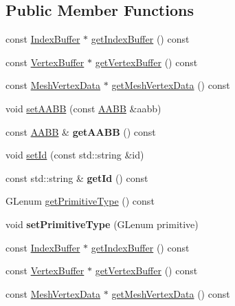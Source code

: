 \subsection*{Public Member Functions}
\begin{DoxyCompactItemize}
\item 
const \hyperlink{classIndexBuffer}{Index\+Buffer} $\ast$ \hyperlink{classMeshIndexData_af62aa3dff45b86690cd6d8eb412843b3}{get\+Index\+Buffer} () const
\item 
const \hyperlink{classVertexBuffer}{Vertex\+Buffer} $\ast$ \hyperlink{classMeshIndexData_abc2bce53ba2a672d1b5919a144e13c71}{get\+Vertex\+Buffer} () const
\item 
const \hyperlink{classMeshVertexData}{Mesh\+Vertex\+Data} $\ast$ \hyperlink{classMeshIndexData_ac7e2059a939129392e0e854b95e0b5fa}{get\+Mesh\+Vertex\+Data} () const
\item 
void \hyperlink{classMeshIndexData_a20756e29720a84945cae48decb15c7fa}{set\+A\+A\+BB} (const \hyperlink{classAABB}{A\+A\+BB} \&aabb)
\item 
\mbox{\label{classMeshIndexData_a2586f3fc18289e290e9b2ad40d76bbf8}} 
const \hyperlink{classAABB}{A\+A\+BB} \& {\bfseries get\+A\+A\+BB} () const
\item 
void \hyperlink{classMeshIndexData_a9ad0c017805d1340f39eace9dab6b758}{set\+Id} (const std\+::string \&id)
\item 
\mbox{\label{classMeshIndexData_ad95d1e4400fca6ba940f275e5837fc8c}} 
const std\+::string \& {\bfseries get\+Id} () const
\item 
G\+Lenum \hyperlink{classMeshIndexData_ab5861ae0ec258b50381b8ff4b3e6719d}{get\+Primitive\+Type} () const
\item 
\mbox{\label{classMeshIndexData_af0f414abe597445d480b37f2eedc16c7}} 
void {\bfseries set\+Primitive\+Type} (G\+Lenum primitive)
\item 
const \hyperlink{classIndexBuffer}{Index\+Buffer} $\ast$ \hyperlink{classMeshIndexData_af62aa3dff45b86690cd6d8eb412843b3}{get\+Index\+Buffer} () const
\item 
const \hyperlink{classVertexBuffer}{Vertex\+Buffer} $\ast$ \hyperlink{classMeshIndexData_a93a8b240d99675e7746333894baa2221}{get\+Vertex\+Buffer} () const
\item 
const \hyperlink{classMeshVertexData}{Mesh\+Vertex\+Data} $\ast$ \hyperlink{classMeshIndexData_ac7e2059a939129392e0e854b95e0b5fa}{get\+Mesh\+Vertex\+Data} () const

\end{DoxyCompactItemize}

